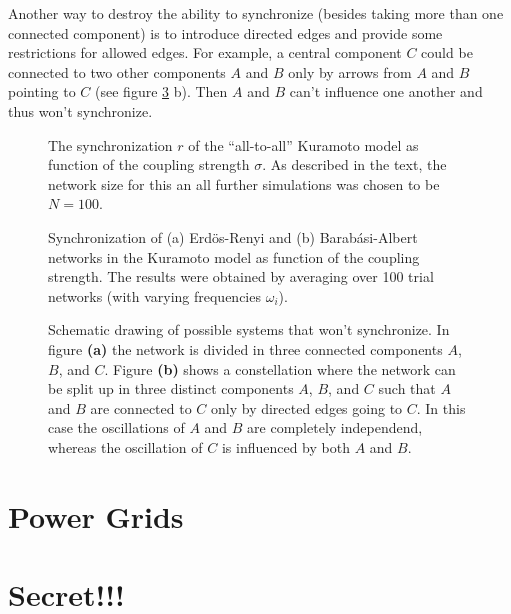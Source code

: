 \documentclass{scrartcl}
\begin{document}
Another way to destroy the ability to synchronize (besides taking more than
one connected component) is to introduce directed edges and provide some
restrictions for allowed edges. For example, a central component $C$ could
be connected to two other components $A$ and $B$ only by arrows from $A$
and $B$ pointing to $C$ (see figure \ref{fig:B13} b). Then $A$ and $B$
can't influence one another and thus won't synchronize.

\begin{figure}
    \centering
    \caption{The synchronization $r$ of the \enquote{all-to-all} Kuramoto
            model as function of the coupling strength $\sigma$. As
            described in the text, the network size for this an all further
            simulations was chosen to be $N=100$.}
    \label{fig:B11}
\end{figure}

\begin{figure}
    \centering
    \caption{Synchronization of (a) Erdös-Renyi and (b) Barab\'asi-Albert
            networks in the Kuramoto model as function of the coupling
            strength. The results were obtained by averaging over 100 trial
            networks (with varying frequencies $\omega_i$).}
    \label{fig:B12}
\end{figure}

\begin{figure}
    \centering
    \def\svgwidth{0.8\textwidth}
    
    \caption{Schematic drawing of possible systems that won't synchronize. In
        figure \textbf{(a)} the network is divided in three connected
        components $A$, $B$, and $C$. Figure \textbf{(b)} shows a constellation where the network
        can be split up in three distinct components $A$, $B$, and $C$ such that $A$ and
        $B$ are connected to $C$ only by directed edges going to $C$. In this
        case the oscillations of $A$ and $B$ are completely independend, whereas
        the oscillation of $C$ is influenced by both $A$ and $B$.}
    \label{fig:B13}
\end{figure}


\clearpage
\section{Power Grids}

\section{Secret!!!}
\end{document}
